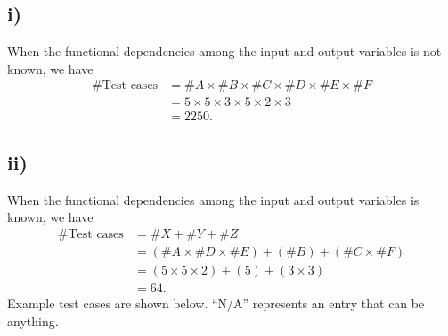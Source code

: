 \documentclass[12pt, letterpaper, titlepage]{article}
\begin{document}
\subsection*{i)}
When the functional dependencies among the input and output variables is not known, we have 
\begin{align}
    \text{\#Test cases} &= \#A \times \#B \times \#C \times \#D \times \#E \times \#F \\
    &= 5 \times 5  \times 3 \times 5 \times 2 \times 3 \\
    &= 2250.
\end{align}

\subsection*{ii)}
When the functional dependencies among the input and output variables is known, we have 
\begin{align}
    \text{\#Test cases} &= \#X + \#Y + \#Z \\
    &= (\#A \times \#D \times \#E) + (\#B) + (\#C \times \#F) \\
    &= (5 \times 5 \times 2) + (5) + (3 \times 3) \\
    &= 64.
\end{align}
Example test cases are shown below. ``N/A'' represents an entry that can be anything.
\end{document}
